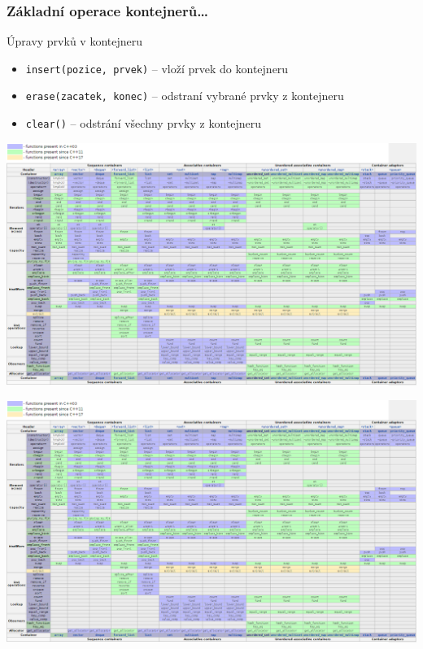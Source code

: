 \begin{frame}[fragile]
\frametitle{Základní operace kontejnerů\ldots}
\begin{block}{Úpravy prvků v kontejneru}
\begin{itemize}
\item \lstinline|insert(pozice, prvek)| -- vloží prvek do kontejneru
\item \lstinline|erase(zacatek, konec)| -- odstraní vybrané prvky z kontejneru
\item \lstinline|clear()| -- odstrání všechny prvky z kontejneru
\end{itemize}
\end{block}
\end{frame}


\begin{frame}
\includegraphics[width=\linewidth,clip,trim=0 6.3cm 15.5cm 0]{img/kontejnery-prehled-metod.png}
\end{frame}

\begin{frame}
\includegraphics[width=\linewidth,clip,trim=0 0 15.5cm 15.9cm]{img/kontejnery-prehled-metod.png}
\end{frame}











